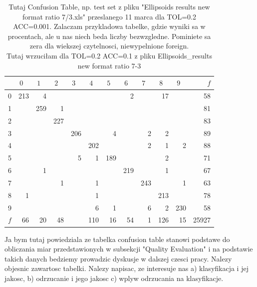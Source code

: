 \documentclass{llncs}
\begin{document}
\begin{table}[h]
\centering
\caption{\color{red}Tutaj Confusion Table, np. test set z pliku "Ellipsoids results new format ratio 7/3.xls" przeslanego 11 marca dla TOL=0.2 ACC=0.001. Zalaczam przykladowa tabelke, gdzie wyniki sa w procentach, ale u nas niech beda liczby bezwzgledne. Pominiete sa zera dla wiekszej czytelnosci, niewypelnione foreign. \\
\color{green}Tutaj wrzuciłam dla TOL=0.2 ACC=0.1 z pliku Ellipsoids_results new format ratio 7-3\\}
\setlength{\tabcolsep}{3pt}
\renewcommand{\arraystretch}{1}
{\small
\begin{tabular}{|c||r|r|r|r|r|r|r|r|r|r|r|}
\hline
 \hspace{15pt} & $0\;\;\;$ & $1\;\;\;$ & $2\;\;\;$ & $3\;\;\;$ & $4\;\;\;$ & $5\;\;\;$ & $6\;\;\;$ & $7\;\;\;$ & $8\;\;\;$ & $9\;\;\;$ & $f$ \\
\hline\hline
  0 & 213 & 4 &   &   &   &   & 2 &   & 17 &   & 58\\
\hline
  1 &  & 259 & 1 &   &   &   &   &   &   &   & 81\\
\hline
  2 &  &   & 227 &   &   &   &   &   &   &   & 83\\
\hline
  3 &  &   &   & 206 &   & 4 &   & 2 & 2 &   & 89\\
\hline
  4 &  &   &   &   & 202 &   &   & 2 & 1 & 2 & 88\\
\hline
  5 &  &   &   & 5 & 1 & 189 &   &   & 2 &   & 71\\
\hline
  6 &  & 1 &   &   &   &   & 219 &   & 1 &   & 67\\
\hline
  7 &  &   & 1 &   & 1 &   &   & 243 &   & 1 & 63\\
\hline
  8 & 1 &   &   &   & 1 &   &   &   & 213 &   & 78\\
\hline
  9 &  &   &   &   & 6 & 1 &   & 6 & 2 & 230 & 58\\
\hline
$f$ & 66 & 20 & 48 &   & 110  & 16 & 54 & 1 & 126 & 15 & 25927\\
\hline
\end{tabular}
}
\label{tab:CofusionTable}
\end{table}

{\color{blue}Ja bym tutaj powiedziala ze tabelka confusion table stanowi podstawe do obliczania miar przedstawionych w subsekcji "Quality Evaluation" i na podstawie takich danych bedziemy prowadzic dyskusje w dalszej czesci pracy.  Nalezy objesnic zawartosc tabelki. Nalezy napisac, ze interesuje nas a) klasyfikacja i jej jakosc, b) odrzucanie i jego jakosc c) wplyw odrzucania na klasyfikacje. }
\end{document}
